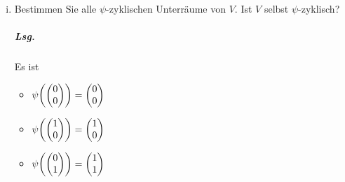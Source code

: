 \documentclass{scrreprt}
\begin{document}
\begin{enumerate}[(i)]
\begin{multicols}{2}
\begin{itemize}
  \item$\psi\qty(
      \begin{pmatrix}1\\1\end{pmatrix}
    ) = \begin{pmatrix}1\\1\end{pmatrix}$
  \end{itemize}
  \end{multicols}
  Folglich sind $U_1$ mit $\left\langle
    \varphi^i\qty(\begin{pmatrix}0\\0\end{pmatrix})
  \right\rangle_{i \in \mathbb{N}_0} = U_1$,
  $U_4$ mit $\left\langle
    \varphi^i\qty(\begin{pmatrix}1\\1\end{pmatrix})
  \right\rangle_{i \in \mathbb{N}_0} = U_3$
  und $V$ mit $\left\langle
    \varphi^i\qty(\begin{pmatrix}1\\0\end{pmatrix})
  \right\rangle_{i \in \mathbb{N}_0} = V$ die $\varphi$-zyklischen
  Unterräume von $V$.

\item Bestimmen Sie alle $\psi$-zyklischen Unterräume von $V$.
  Ist $V$ selbst $\psi$-zyklisch?

  \subparagraph{Lsg.} Es ist
  \begin{multicols}{2}
  \begin{itemize}
  \item $\psi\qty(
      \begin{pmatrix}0\\0\end{pmatrix}
    ) = \begin{pmatrix}0\\0\end{pmatrix}$

  \item $\psi\qty(
      \begin{pmatrix}1\\0\end{pmatrix}
    ) = \begin{pmatrix}1\\0\end{pmatrix}$

  \item $\psi\qty(
      \begin{pmatrix}0\\1\end{pmatrix}
    ) = \begin{pmatrix}1\\1\end{pmatrix}$


\end{itemize}
\end{multicols}
\end{enumerate}
\end{document}
